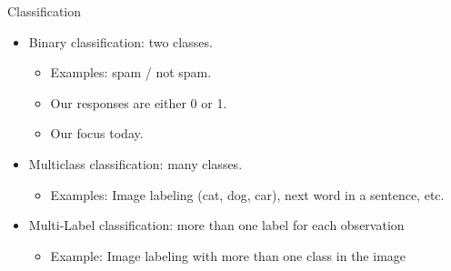 \documentclass[aspectratio=169]{../latex_main/tntbeamer}  %
\begin{document}
	
	\begin{frame}[c]{Classification}
	    \begin{itemize}
	        \item Binary classification: two classes.
	        \begin{itemize}
	            \item Examples: spam / not spam. 
	            \item Our responses are either 0 or 1.
	            \item Our focus today.
	        \end{itemize}
	        \item Multiclass classification: many classes.
	        \begin{itemize}
	            \item Examples: Image labeling (cat, dog, car), next word in a sentence, etc.
	        \end{itemize}
	        \item Multi-Label classification: more than one label for each observation
	        \begin{itemize}
	            \item Example: Image labeling with more than one class in the image 
	        \end{itemize}
	    \end{itemize}
	\end{frame}
	
\end{document}
